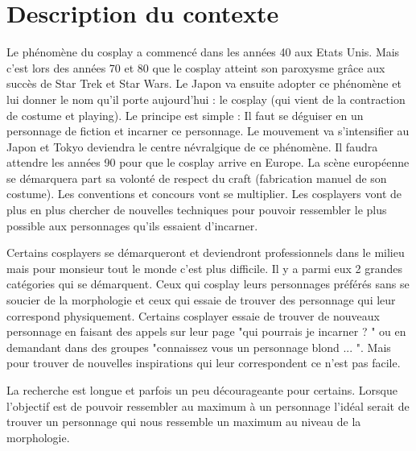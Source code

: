 \documentclass[a4paper,12pt]{article}
\begin{document}
\newpage



\section{Description du contexte}
Le phénomène du cosplay a commencé dans les années 40 aux Etats Unis. Mais c'est lors des années 70 et 80 que le cosplay atteint son paroxysme grâce aux succès de Star Trek et Star Wars. Le Japon va ensuite adopter ce phénomène et lui donner le nom qu'il porte aujourd'hui : le cosplay (qui vient de la contraction de costume et playing). Le principe est simple : Il faut se déguiser en un personnage de fiction et incarner ce personnage. Le mouvement va s'intensifier au Japon et Tokyo deviendra le centre névralgique de ce phénomène. Il faudra attendre les années 90 pour que le cosplay arrive en Europe. La scène européenne se démarquera part sa volonté de respect du craft (fabrication manuel de son costume). Les conventions et concours vont se multiplier. Les cosplayers vont de plus en plus chercher de nouvelles techniques pour pouvoir ressembler le plus possible aux personnages qu'ils essaient d'incarner. 

Certains cosplayers se démarqueront et deviendront professionnels dans le milieu mais pour monsieur tout le monde c'est plus difficile. Il y a parmi eux 2 grandes catégories qui se démarquent. Ceux qui cosplay leurs personnages préférés sans se soucier de la morphologie et ceux qui essaie de trouver des personnage qui leur correspond physiquement. Certains cosplayer essaie de trouver de nouveaux personnage en faisant des appels sur leur page "qui pourrais je incarner ? " ou en demandant dans des groupes "connaissez vous un personnage blond ... ". Mais pour trouver de nouvelles inspirations qui leur correspondent ce n'est pas facile. 

La recherche est longue et parfois un peu décourageante pour certains. 
Lorsque l'objectif est de pouvoir ressembler au maximum à un personnage l'idéal serait de trouver un personnage qui nous ressemble un maximum au niveau de la morphologie. 
\end{document}
